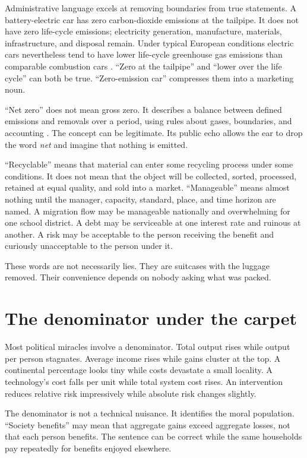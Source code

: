 \documentclass[12pt,a4paper]{book}
\begin{document}
Administrative language excels at removing boundaries from true statements.
A battery-electric car has zero carbon-dioxide emissions at the tailpipe.  It
does not have zero life-cycle emissions; electricity generation, manufacture,
materials, infrastructure, and disposal remain.  Under typical European
conditions electric cars nevertheless tend to have lower life-cycle greenhouse
gas emissions than comparable combustion cars
\cite{EEAElectricVehiclesLifecycle}.  ``Zero at the tailpipe'' and ``lower over
the life cycle'' can both be true.  ``Zero-emission car'' compresses them into a
marketing noun.

``Net zero'' does not mean gross zero.  It describes a balance between defined
emissions and removals over a period, using rules about gases, boundaries, and
accounting \cite{IPCCWGI2021TechnicalSummary}.  The concept can be legitimate.
Its public echo allows the ear to drop the word \emph{net} and imagine that
nothing is emitted.

``Recyclable'' means that material can enter some recycling process under some
conditions.  It does not mean that the object will be collected, sorted,
processed, retained at equal quality, and sold into a market.  ``Manageable''
means almost nothing until the manager, capacity, standard, place, and time
horizon are named.  A migration flow may be manageable nationally and
overwhelming for one school district.  A debt may be serviceable at one
interest rate and ruinous at another.  A risk may be acceptable to the person
receiving the benefit and curiously unacceptable to the person under it.

These words are not necessarily lies.  They are suitcases with the luggage
removed.  Their convenience depends on nobody asking what was packed.

\section{The denominator under the carpet}

Most political miracles involve a denominator.  Total output rises while
output per person stagnates.  Average income rises while gains cluster at the
top.  A continental percentage looks tiny while costs devastate a small
locality.  A technology's cost falls per unit while total system cost rises.
An intervention reduces relative risk impressively while absolute risk changes
slightly.

The denominator is not a technical nuisance.  It identifies the moral
population.  ``Society benefits'' may mean that aggregate gains exceed
aggregate losses, not that each person benefits.  The sentence can be correct
while the same households pay repeatedly for benefits enjoyed elsewhere.
\end{document}
